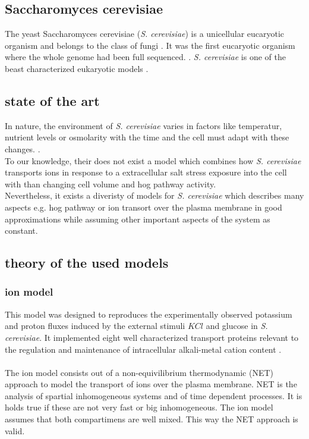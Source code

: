 \subsection{Saccharomyces cerevisiae}
The yeast Saccharomyces cerevisiae (\emph{S. cerevisiae}) is a unicellular eucaryotic organism and belongs to the class of fungi \cite{Feyder2015}. It was the first eucaryotic organism where the whole genome had been full sequenced. \cite{goffeau1996life}. \emph{S. cerevisiae} is one of the beast characterized eukaryotic models \cite{Feyder2015}.


\subsection{state of the art}

In nature, the environment of \emph{S. cerevisiae} varies in factors like temperatur, nutrient levels or osmolarity with the time and the cell must adapt with these changes.  \cite{JannisUhlendorf}. \\To our knowledge, their does not exist a model which combines how \emph{S. cerevisiae} transports ions in response to a extracellular salt stress exposure into the cell with than changing cell volume and hog pathway activity. \\
Nevertheless, it exists a diveristy of models for \emph{S. cerevisiae} which describes many aspects e.g. hog pathway or ion transort over the plasma membrane in good approximations while assuming other important aspects of the system as constant.

\subsection{theory of the used models}
\subsubsection{ion model}
This model was designed to reproduces the experimentally observed potassium and proton fluxes induced by the external stimuli $KCl$ and glucose in \emph{S. cerevisiae}. It implemented eight well characterized transport proteins relevant to the regulation and maintenance of intracellular alkali-metal cation content \cite{Gerber_2016}. \\\\
The ion model consists out of a non-equivilibrium thermodynamic (NET) approach to model the transport of ions over the plasma membrane. NET is the analysis of spartial inhomogeneous systems and of time dependent processes. It is holds true if these are not very fast or big inhomogeneous. The ion model assumes that both compartimens are well mixed. This way the NET approach is valid.\\

